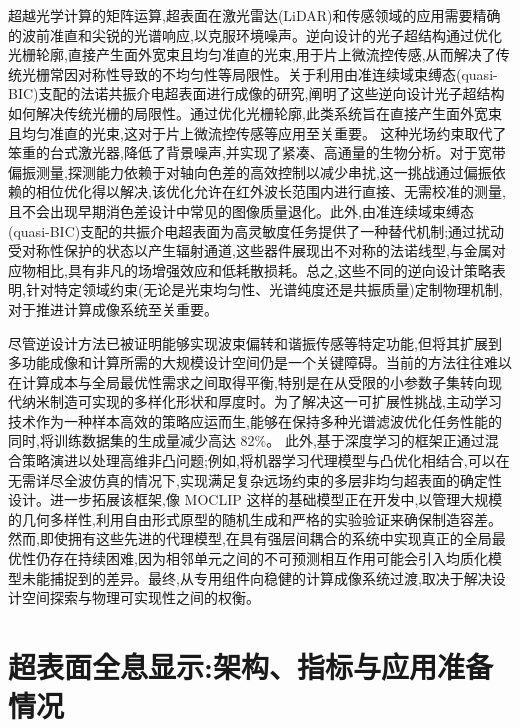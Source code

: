 超越光学计算的矩阵运算,超表面在激光雷达(LiDAR)和传感领域的应用需要精确的波前准直和尖锐的光谱响应,以克服环境噪声。逆向设计的光子超结构通过优化光栅轮廓,直接产生面外宽束且均匀准直的光束,用于片上微流控传感,从而解决了传统光栅常因对称性导致的不均匀性等局限性。关于利用由准连续域束缚态(quasi-BIC)支配的法诺共振介电超表面进行成像的研究,阐明了这些逆向设计光子超结构如何解决传统光栅的局限性。通过优化光栅轮廓,此类系统旨在直接产生面外宽束且均匀准直的光束,这对于片上微流控传感等应用至关重要。\citep{s2_42f2fcc893f3a45ac750a8ffe67752f8533c0c61_58d9419c} 这种光场约束取代了笨重的台式激光器,降低了背景噪声,并实现了紧凑、高通量的生物分析。对于宽带偏振测量,探测能力依赖于对轴向色差的高效控制以减少串扰,这一挑战通过偏振依赖的相位优化得以解决,该优化允许在红外波长范围内进行直接、无需校准的测量,且不会出现早期消色差设计中常见的图像质量退化。此外,由准连续域束缚态(quasi-BIC)支配的共振介电超表面为高灵敏度任务提供了一种替代机制;通过扰动受对称性保护的状态以产生辐射通道,这些器件展现出不对称的法诺线型,与金属对应物相比,具有非凡的场增强效应和低耗散损耗。总之,这些不同的逆向设计策略表明,针对特定领域约束(无论是光束均匀性、光谱纯度还是共振质量)定制物理机制,对于推进计算成像系统至关重要。\citep{doi_10_1038_s41598_021_84841_2_2ce5ab57} \citep{doi_10_29026_oea_2022_220058_79ee78ee} \citep{s2_42f2fcc893f3a45ac750a8ffe67752f8533c0c61_58d9419c}

尽管逆设计方法已被证明能够实现波束偏转和谐振传感等特定功能,但将其扩展到多功能成像和计算所需的大规模设计空间仍是一个关键障碍。当前的方法往往难以在计算成本与全局最优性需求之间取得平衡,特别是在从受限的小参数子集转向现代纳米制造可实现的多样化形状和厚度时。为了解决这一可扩展性挑战,主动学习技术作为一种样本高效的策略应运而生,能够在保持多种光谱滤波优化任务性能的同时,将训练数据集的生成量减少高达 82\%。\citep{doi_10_1364_oe_559669_898a2205} 此外,基于深度学习的框架正通过混合策略演进以处理高维非凸问题;例如,将机器学习代理模型与凸优化相结合,可以在无需详尽全波仿真的情况下,实现满足复杂远场约束的多层非均匀超表面的确定性设计。进一步拓展该框架,像 MOCLIP 这样的基础模型正在开发中,以管理大规模的几何多样性,利用自由形式原型的随机生成和严格的实验验证来确保制造容差。然而,即使拥有这些先进的代理模型,在具有强层间耦合的系统中实现真正的全局最优性仍存在持续困难,因为相邻单元之间的不可预测相互作用可能会引入均质化模型未能捕捉到的差异。最终,从专用组件向稳健的计算成像系统过渡,取决于解决设计空间探索与物理可实现性之间的权衡。\citep{doi_10_1364_oe_559669_898a2205} \citep{doi_10_1038_s41467_026_76714_x_8ca5d39b} \citep{doi_10_1109_tap_2021_3137496_d4a1d597}

\section{超表面全息显示:架构、指标与应用准备情况}\label{ux8d85ux8868ux9762ux5168ux606fux663eux793aux67b6ux6784ux6307ux6807ux4e0eux5e94ux7528ux51c6ux5907ux60c5ux51b5}

